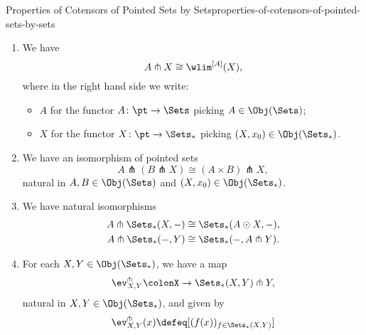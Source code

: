\begin{proposition}{Properties of Cotensors of Pointed Sets by Sets}{properties-of-cotensors-of-pointed-sets-by-sets}
\begin{enumerate}
\begin{webcompile}
            \end{webcompile}
            witnessed by a bijection
            \[
                \Hom_{\Sets_{*}}(A\odot X,Y)%
                \cong%
                \Hom_{\Sets_{*}}(X,A\pitchfork Y),%
            \]%
            natural in $A\in\Obj(\Sets)$ and $X,Y\in\Obj(\Sets_{*})$.
        \item\label{properties-of-cotensors-of-pointed-sets-by-sets-as-a-weighted-limit}We have
            \[
                A\pitchfork X%
                \cong%
                \wlim^{[A]}(X),
            \]%
            where in the right hand side we write:
            \begin{itemize}
                \item $A$ for the functor $A\colon\pt\to\Sets$ picking $A\in\Obj(\Sets)$;
                \item $X$ for the functor $X\colon\pt\to\Sets_{*}$ picking $(X,x_{0})\in\Obj(\Sets_{*})$.
            \end{itemize}
        \item\label{properties-of-cotensors-of-pointed-sets-by-sets-iterated-cotensors}We have an isomorphism of pointed sets
            \[
                A\pitchfork(B\pitchfork X)%
                \cong%
                (A\times B)\pitchfork X,%
            \]%
            natural in $A,B\in\Obj(\Sets)$ and $(X,x_{0})\in\Obj(\Sets_{*})$.
        \item\label{properties-of-cotensors-of-pointed-sets-by-sets-commutativity-with-homs}We have natural isomorphisms
            \begin{align*}
                A\pitchfork\Sets_{*}(X,-) &\cong \Sets_{*}(A\odot X,-),\\
                A\pitchfork\Sets_{*}(-,Y) &\cong \Sets_{*}(-,A\pitchfork Y).
            \end{align*}
        \item\label{properties-of-cotensors-of-pointed-sets-by-sets-the-cotensor-evaluation-map}For each $X,Y\in\Obj(\Sets_{*})$, we have a map
            \[
                \ev^{\pitchfork}_{X,Y}%
                \colon%
                X%
                \to%
                \Sets_{*}(X,Y)\pitchfork Y,%
            \]%
            natural in $X,Y\in\Obj(\Sets_{*})$, and given by
            \[%
                \ev^{\pitchfork}_{X,Y}(x)%
                \defeq%
                [(f(x))_{f\in\Sets_{*}(X,Y)}]%
\]
\end{enumerate}
\end{proposition}
